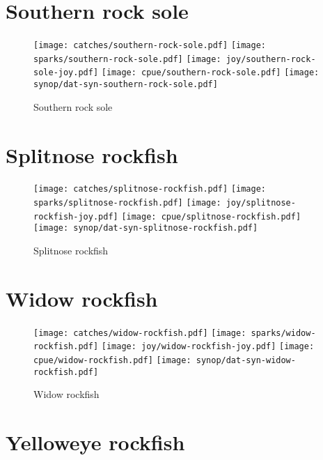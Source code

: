 \section*{Southern rock sole}

\begin{figure}[htbp]
\centering
\texttt{[image: catches/southern-rock-sole.pdf]}
\texttt{[image: sparks/southern-rock-sole.pdf]}
\texttt{[image: joy/southern-rock-sole-joy.pdf]}
\texttt{[image: cpue/southern-rock-sole.pdf]}
\texttt{[image: synop/dat-syn-southern-rock-sole.pdf]}
\caption{Southern rock sole}
\end{figure}
\clearpage
\section*{Splitnose rockfish}

\begin{figure}[htbp]
\centering
\texttt{[image: catches/splitnose-rockfish.pdf]}
\texttt{[image: sparks/splitnose-rockfish.pdf]}
\texttt{[image: joy/splitnose-rockfish-joy.pdf]}
\texttt{[image: cpue/splitnose-rockfish.pdf]}
\texttt{[image: synop/dat-syn-splitnose-rockfish.pdf]}
\caption{Splitnose rockfish}
\end{figure}
\clearpage
\section*{Widow rockfish}

\begin{figure}[htbp]
\centering
\texttt{[image: catches/widow-rockfish.pdf]}
\texttt{[image: sparks/widow-rockfish.pdf]}
\texttt{[image: joy/widow-rockfish-joy.pdf]}
\texttt{[image: cpue/widow-rockfish.pdf]}
\texttt{[image: synop/dat-syn-widow-rockfish.pdf]}
\caption{Widow rockfish}
\end{figure}
\clearpage
\section*{Yelloweye rockfish}

